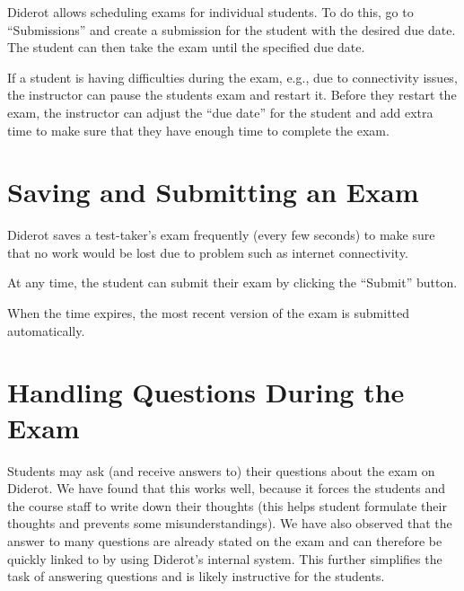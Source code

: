 \begin{gram}
Diderot allows scheduling exams for individual students.  To do this, go to ``Submissions'' and create a submission for the student with the desired due date.  The student can then take the exam until the specified due date.
\end{gram}


\begin{gram}

If a student is having difficulties during the exam, e.g., due to connectivity issues, the instructor can pause the students exam and restart it.  Before they restart the exam, the instructor can adjust the ``due date'' for the student and add extra time to make sure that they have enough time to complete the exam. 

\end{gram}

\section{Saving and Submitting an Exam}
\label{ch:quiz::submit}

\begin{gram}
Diderot saves a test-taker's exam frequently (every few seconds) to make sure that no work would be lost due to problem such as internet connectivity.  

At any time, the student can submit their exam by clicking the ``Submit'' button.

When the time expires, the most recent version of the exam is submitted automatically.
\end{gram}


\section{Handling Questions During the Exam}

Students may ask (and receive answers to) their questions about the
exam on Diderot.
%
We have found that this works well, because it forces the students and
the course staff to write down their thoughts (this helps student
formulate their thoughts and prevents some misunderstandings).
%
We have also observed that the answer to many questions are already
stated on the exam and can therefore be quickly linked to by using
Diderot's internal  system.
%
This further simplifies the task of answering questions and is likely
instructive for the students.



